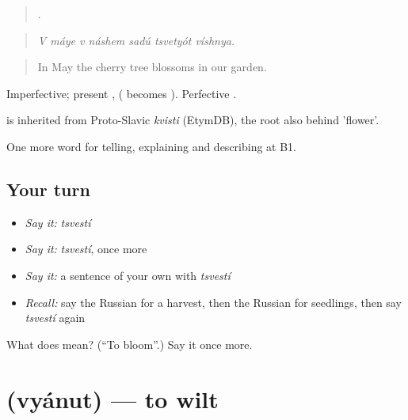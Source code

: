 \begin{quote}
      .
\end{quote}

\begin{quote}
\emph{V máye v náshem sadú tsvetyót víshnya.}
\end{quote}

\begin{quote}
In May the cherry tree blossoms in our garden.
\end{quote}

Imperfective; present ,  ( becomes ). Perfective .

\begin{cousinweb}
\emph{} is inherited from Proto-Slavic \emph{kvisti} (EtymDB), the root also behind \emph{} 'flower'.
\end{cousinweb}

\begin{grammarlens}[title={What you've built}]
One more word for telling, explaining and describing at B1.
\end{grammarlens}

\subsection*{Your turn}
\begin{itemize}
\raggedright
  \item \emph{Say it:} \emph{tsvestí}
  \item \emph{Say it:} \emph{tsvestí}, once more
  \item \emph{Say it:} a sentence of your own with \emph{tsvestí}
  \item \emph{Recall:} say the Russian for a harvest, then the Russian for seedlings, then say \emph{tsvestí} again
\end{itemize}

\begin{tcolorbox}[breakable,colback=teal!4,colframe=teal!35!black,title={Before you move on}]
What does  mean? (\textquotedblleft{}To bloom\textquotedblright{}.) Say it once more.
\end{tcolorbox}
\section[\texorpdfstring{\ru{вянуть} (vyánut)}{вянуть (vyánut)}]{ (vyánut) — to wilt}

